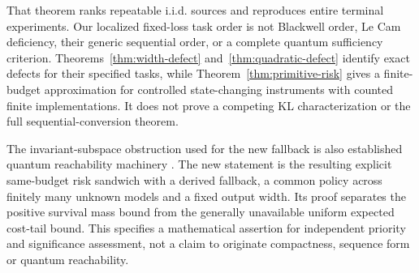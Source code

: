 That theorem ranks repeatable i.i.d. sources and reproduces entire terminal experiments. Our localized fixed-loss task order is not Blackwell order, Le Cam deficiency, their generic sequential order, or a complete quantum sufficiency criterion. Theorems~\ref{thm:width-defect} and~\ref{thm:quadratic-defect} identify exact defects for their specified tasks, while Theorem~\ref{thm:primitive-risk} gives a finite-budget approximation for controlled state-changing instruments with counted finite implementations. It does not prove a competing KL characterization or the full sequential-conversion theorem.

The invariant-subspace obstruction used for the new fallback is also established quantum reachability machinery \cite[Theorem 3.6]{Ying14pre}. The new statement is the resulting explicit same-budget risk sandwich with a derived fallback, a common policy across finitely many unknown models and a fixed output width. Its proof separates the positive survival mass bound from the generally unavailable uniform expected cost-tail bound. This specifies a mathematical assertion for independent priority and significance assessment, not a claim to originate compactness, sequence form or quantum reachability.
